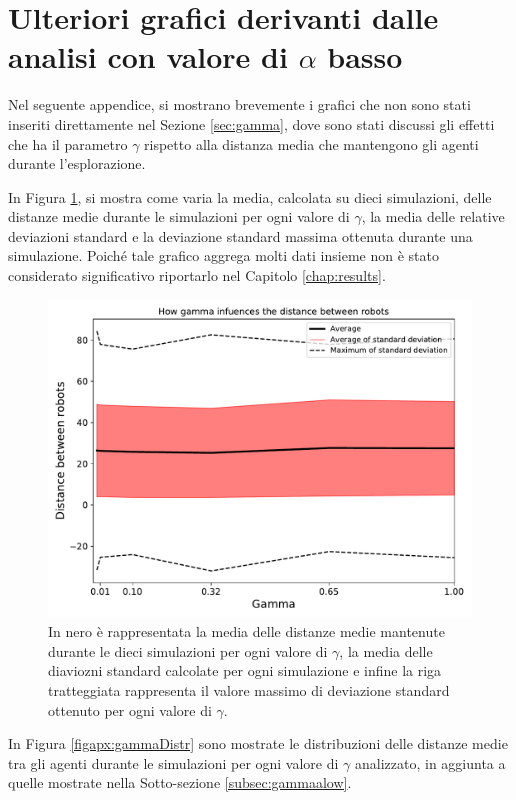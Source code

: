 \section{Ulteriori grafici derivanti dalle analisi con valore di $\alpha$ basso}
Nel seguente appendice, si mostrano brevemente i grafici che non sono stati inseriti direttamente nel Sezione \ref{sec:gamma}, dove sono stati discussi gli effetti che ha il parametro $\gamma$ rispetto alla distanza media che mantengono gli agenti durante l'esplorazione.

In Figura \ref{figapx:gammavsdistance}, si mostra come varia la media, calcolata su dieci simulazioni, delle distanze medie durante le simulazioni per ogni valore di $\gamma$, la media delle relative deviazioni standard e la deviazione standard massima ottenuta durante una simulazione. 
Poiché tale grafico aggrega molti dati insieme non è stato considerato significativo riportarlo nel Capitolo \ref{chap:results}.\\
\begin{figure}
	\centering
	\includegraphics[width=0.9\linewidth]{images/gamma_results/low_alpha/gamma_vs_distance}
	\caption{In nero è rappresentata la media delle distanze medie mantenute durante le dieci simulazioni per ogni valore di $\gamma$, la media delle diaviozni standard calcolate per ogni simulazione e infine la riga tratteggiata rappresenta il valore massimo di deviazione standard ottenuto per ogni valore di $\gamma$.}
	\label{figapx:gammavsdistance}
\end{figure}
In Figura \ref{figapx:gammaDistr} sono mostrate le distribuzioni delle distanze medie tra gli agenti durante le simulazioni per ogni valore di $\gamma$ analizzato, in aggiunta a quelle mostrate nella Sotto-sezione \ref{subsec:gammaalow}.\\
